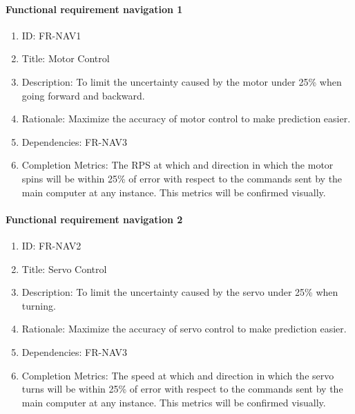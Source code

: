 \documentclass[compsoc,draftclsnofoot,onecolumn,10pt]{IEEEtran}
\begin{document}
	\paragraph{Functional requirement navigation 1}
		\begin{enumerate}
			\item ID: FR-NAV1
			\item Title: Motor Control
			\item Description: To limit the uncertainty caused by the motor under 25\% when going forward and backward.
			\item Rationale: Maximize the accuracy of motor control to make prediction easier.
			\item Dependencies: FR-NAV3
			\item Completion Metrics: The RPS at which and direction in which the motor spins will be within 25\% of error with 
			respect to the commands sent by the main computer at any instance. This metrics will be confirmed visually. 
		\end{enumerate}

	\paragraph{Functional requirement navigation 2}
		\begin{enumerate}
			\item ID: FR-NAV2
			\item Title: Servo Control
			\item Description: To limit the uncertainty caused by the servo under 25\% when turning.
			\item Rationale: Maximize the accuracy of servo control to make prediction easier.
			\item Dependencies: FR-NAV3
			\item Completion Metrics: The speed at which and direction in which the servo turns will be within 25\% of error with 
			respect to the commands sent by the main computer at any instance. This metrics will be confirmed visually. 
		\end{enumerate}
\end{document}
